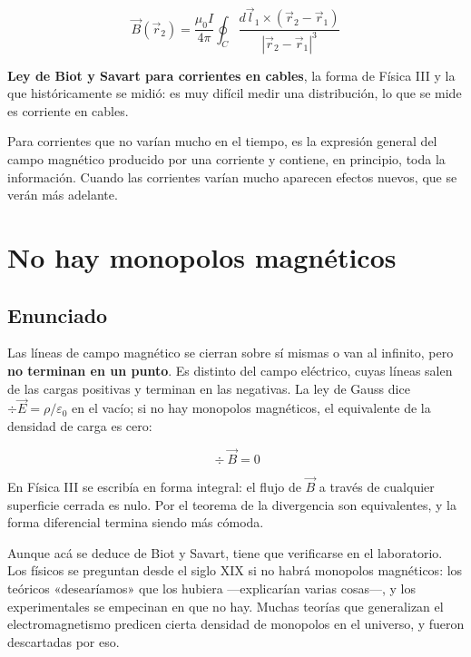 \documentclass[12pt,a4paper]{article}
\begin{document}
\begin{keybox}
\[
\boxed{\ \vec B(\vec r_2) = \frac{\mu_0 I}{4\pi}\oint_C
\frac{d\vec l_1\times(\vec r_2-\vec r_1)}{|\vec r_2-\vec r_1|^3}\ }
\]
\end{keybox}

\textbf{Ley de Biot y Savart para corrientes en cables}, la forma de Física III y la
que históricamente se midió: es muy difícil medir una distribución, lo que se
mide es corriente en cables.

\begin{warnbox}
Para corrientes que no varían mucho en el tiempo, es
la expresión general del campo magnético producido por una corriente y
contiene, en principio, toda la información. Cuando las corrientes varían
mucho aparecen efectos nuevos, que se verán más adelante.
\end{warnbox}

\section{No hay monopolos magnéticos}

\subsection{Enunciado}

Las líneas de campo magnético se cierran sobre sí mismas o van al infinito, pero
\textbf{no terminan en un punto}. Es distinto del campo eléctrico, cuyas líneas salen
de las cargas positivas y terminan en las negativas. La ley de Gauss dice
$\div \vec E = \rho/\varepsilon_0$ en el vacío; si no hay monopolos
magnéticos, el equivalente de la densidad de carga es cero:

\begin{keybox}
\[
\boxed{\ \div \vec B = 0\ }
\]
\end{keybox}

En Física III se escribía en forma integral: el flujo de $\vec B$ a través de
cualquier superficie cerrada es nulo. Por el teorema de la divergencia son
equivalentes, y la forma diferencial termina siendo más cómoda.

\begin{notebox}
Aunque acá se deduce de Biot y Savart, tiene que
verificarse en el laboratorio. Los físicos se preguntan desde el siglo XIX si
no habrá monopolos magnéticos: los teóricos «desearíamos» que los hubiera
---explicarían varias cosas---, y los experimentales se empecinan en que no hay.
Muchas teorías que generalizan el electromagnetismo predicen cierta densidad
de monopolos en el universo, y fueron descartadas por eso.
\end{notebox}
\end{document}
